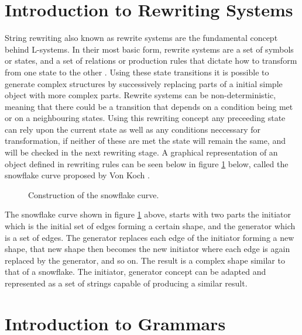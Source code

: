 \section{Introduction to Rewriting Systems}

String rewriting also known as rewrite systems are the fundamental concept behind L-systems. In their most basic form, rewrite systems are a set of symbols or states, and a set of relations or production rules that dictate how to transform from one state to the other \cite{prusinkiewicz2012algorithmic}. Using these state transitions it is possible to generate complex structures by successively replacing parts of a initial simple object with more complex parts. Rewrite systems can be non-deterministic, meaning that there could be a transition that depends on a condition being met or on a neighbouring states. Using this rewriting concept any preceeding state can rely upon the current state as well as any conditions neccessary for transformation, if neither of these are met the state will remain the same, and will be checked in the next rewriting stage. A graphical representation of an object defined in rewriting rules can be seen below in figure \ref{snowflake curve} below, called the snowflake curve proposed by Von Koch \cite{koch1906methode}.

\begin{figure}[htbp]
	{\centering
		\setlength{\fboxrule}{1pt}
		\vspace{7px}
		\caption{Construction of the snowflake curve\cite{prusinkiewicz2013lindenmayer}.} \label{snowflake curve}
	}
\end{figure}
\FloatBarrier

The snowflake curve shown in figure \ref{snowflake curve} above, starts with two parts the initiator which is the initial set of edges forming a certain shape, and the generator which is a set of edges. The generator replaces each edge of the initiator forming a new shape, that new shape then becomes the new initiator where each edge is again replaced by the generator, and so on. The result is a complex shape similar to that of a snowflake. The initiator, generator concept can be adapted and represented as a set of strings capable of producing a similar result.

\section{Introduction to Grammars}

